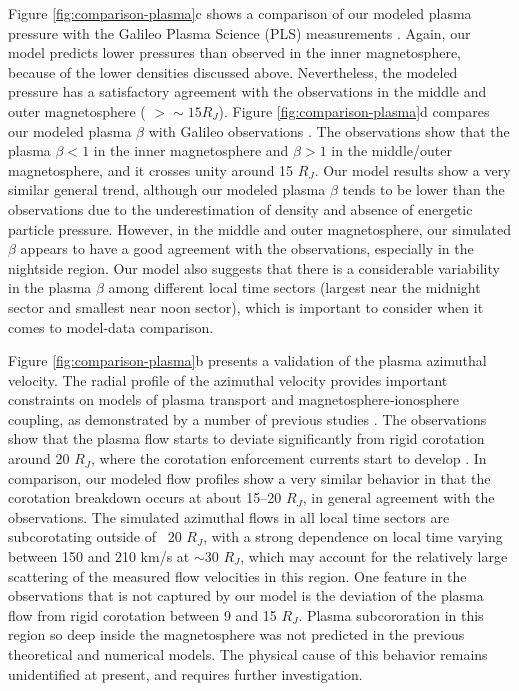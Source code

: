 Figure \ref{fig:comparison-plasma}c shows a comparison of our modeled plasma pressure with the Galileo Plasma Science (PLS) measurements \cite{Frank2002}. Again, our model predicts lower pressures than observed in the inner magnetosphere, because of the lower densities discussed above. Nevertheless, the modeled pressure has a satisfactory agreement with the observations in the middle and outer magnetosphere ( $ >\sim15 R_J$). Figure \ref{fig:comparison-plasma}d compares our modeled plasma $\beta$ with Galileo observations \cite{Mauk2004}. The observations show that the plasma $\beta < 1$ in the inner magnetosphere and $\beta > 1$ in the middle/outer magnetosphere, and it crosses unity around 15 $R_J$. Our model results show a very similar general trend, although our modeled plasma $\beta$ tends to be lower than the observations due to the underestimation of density and absence of energetic particle pressure. However, in the middle and outer magnetosphere, our simulated $\beta$ appears to have a good agreement with the observations, especially in the nightside region. Our model also suggests that there is a considerable variability in the plasma $\beta$ among different local time sectors (largest near the midnight sector and smallest near noon sector), which is important to consider when it comes to model‐data comparison. 

Figure \ref{fig:comparison-plasma}b presents a validation of the plasma azimuthal velocity. The radial profile of the azimuthal velocity provides important constraints on models of plasma transport and magnetosphere‐ionosphere coupling, as demonstrated by a number of previous studies \cite{Cowley2001a,Hill1979,Hill1980,Nichols2011,Nichols2004,Pontius1997}. The observations show that the plasma flow starts to deviate significantly from rigid corotation around 20 $R_J$, where the corotation enforcement currents start to develop \cite{Cowley2001a,Hill2001}. In comparison, our modeled flow profiles show a very similar behavior in that the corotation breakdown occurs at about 15–20 $R_J$, in general agreement with the observations. The simulated azimuthal flows in all local time sectors are subcorotating outside of ~20 $R_J$, with a strong dependence on local time varying between 150 and 210 km/s at $\sim$30 $R_J$, which may account for the relatively large scattering of the measured flow velocities in this region. One feature in the observations that is not captured by our model is the deviation of the plasma flow from rigid corotation between 9 and 15 $R_J$. Plasma subcororation in this region so deep inside the magnetosphere was not predicted in the previous theoretical and numerical models. The physical cause of this behavior remains unidentified at present, and requires further investigation.

